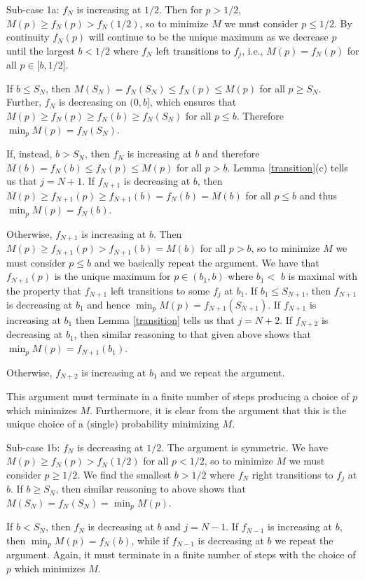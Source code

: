 \documentclass{amsart}
\theoremstyle{plain}
\numberwithin{equation}{section}
\begin{document}
Sub-case 1a: $f_{N}$ is increasing at $1/2$. Then for $p>1/2$, $M(p)\geq
f_{N}(p)>f_{N}(1/2)$, so to minimize $M$ we must consider $p\leq 1/2$. By
continuity $f_{N}(p)$ will continue to be the unique maximum as we decrease $%
p$ until the largest $b<1/2$ where $f_{N}$ left transitions to $f_{j}$,
i.e., $M(p)=f_{N}(p)$ for all $p\in \lbrack b,1/2]$. 


If $b\leq S_{N}$, then $M(S_{N})=f_{N}(S_{N})\leq f_{N}(p)\leq M(p)$ for all 
$p\geq S_{N}$. Further, $f_{N}$ is decreasing on $(0,b]$, which ensures that 
$M(p)\geq f_{N}(p)\geq f_{N}(b)\geq f_{N}(S_{N})$ for all $p\leq b$.
Therefore $\min_{p}M(p)=f_{N}(S_{N})$.

If, instead, $b>S_{N}$, then $f_{N}$ is increasing at $b$ and therefore $M(b)=f_{N}(b)\leq f_{N}(p)\leq M(p)$ for all $p>b$. 
Lemma \ref{transition}(c) tells us that $j=N+1$. If $f_{N+1}$ is decreasing at $b$, then 
$M(p)\geq f_{N+1}(p) \geq f_{N+1}(b)=f_{N}(b)=M(b)$ for all $p\leq b$ and thus $\min_{p}M(p)=f_{N}(b)$.

Otherwise, $f_{N+1}$ is increasing at $b$. Then $M(p)\geq
f_{N+1}(p)>f_{N+1}(b)=M(b)$ for all $p>b$, so to minimize $M$ we must
consider $p\leq b$ and we basically repeat the argument. We have that $%
f_{N+1}(p)$ is the unique maximum for $p\in (b_{1},b)$ where $b_{1}<$ $b$ is
maximal with the property that $f_{N+1}$ left transitions to some $f_{j}$ at 
$b_{1}$. If $b_{1}\leq S_{N+1}$, then $f_{N+1}$ is decreasing at $b_{1}$ and
hence $\min_{p}M(p)=f_{N+1}(S_{N+1})$. If $f_{N+1}$ is increasing at $b_{1}$
then Lemma \ref{transition} tells us that $j=N+2$. If $f_{N+2}$ is
decreasing at $b_{1}$, then similar reasoning to that given above shows that 
$\min_{p}M(p)=f_{N+1}(b_{1})$.

Otherwise, $f_{N+2}$ is increasing at $b_{1}$ and we repeat the argument.

This argument must terminate in a finite number of steps producing a choice
of $p$ which minimizes $M$. Furthermore, it is clear from the argument that
this is the unique choice of a (single) probability minimizing $M$.

Sub-case 1b: $f_{N}$ is decreasing at $1/2$. The argument is symmetric. We
have $M(p)\geq f_{N}(p)>f_{N}(1/2)$ for all $p<1/2$, so to minimize $M$ we
must consider $p\geq 1/2$. We find the smallest $b>1/2$ where $f_{N}$ right
transitions to $f_{j}$ at $b$. If $b\geq S_{N}$, then similar reasoning to
above shows that $M(S_{N})=f_{N}(S_{N})=\min_{p}M(p)$.

If $b<S_{N}$, then $f_{N}$ is decreasing at $b$ and $j=N-1$. If $f_{N-1}$ is
increasing at $b$, then $\min_{p}M(p)=f_{N}(b)$, while if $f_{N-1}$ is
decreasing at $b$ we repeat the argument. Again, it must terminate in a
finite number of steps with the choice of $p$ which minimizes $M$.
\end{document}
